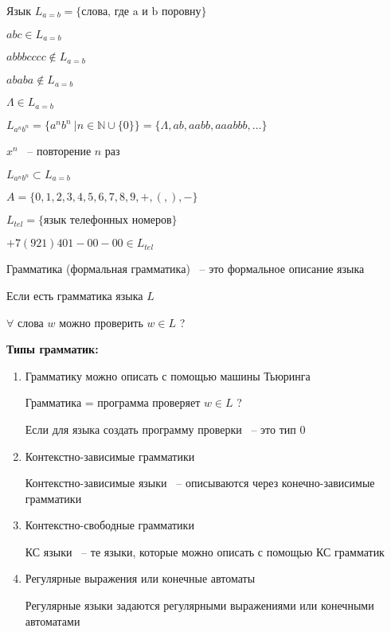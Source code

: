 \documentclass[russian]{lecture-notes}
\begin{document}
    \begin{example}
        Язык $L_{a = b} = \{ \textrm{слова, где a и b поровну}\}$

        $abc \in L_{a = b}$

        $abbbcccc \notin L_{a = b}$

        $ababa \notin L_{a = b}$

        $\Lambda \in L_{a = b}$
    \end{example}

    \begin{example}

        $L_{a^n b^n} = \{ a^n b^n \: | n \in \mathbb{N} \cup \{0 \} \} = \{ \Lambda, ab, aabb, aaabbb, \dots \}$

        $x^n$ ~-- повторение $n$ раз

        $L_{a^n b^n} \subset L_{a = b}$
    \end{example}

    \begin{example}
        $A = \{ 0, 1, 2, 3, 4, 5, 6, 7, 8, 9, +, (, ), - \}$

        $L_{tel} = \{ \textrm{язык телефонных номеров} \}$

        $+7 (921) 401-00-00 \in L_{tel}$
    \end{example}

    \begin{definition}
        Грамматика (формальная грамматика) ~-- это формальное описание языка

        Если есть грамматика языка $L$

        $\forall$ слова $w$ можно проверить $w \in L$ ?
    \end{definition}

    \textbf{Типы грамматик:}

    \begin{enumerate}
        \addtocounter{enumi}{-1}
        \item{
            Грамматику можно описать с помощью машины Тьюринга

            Грамматика = программа проверяет $w \in L$ ?

            Если для языка создать программу проверки ~-- это тип 0
        }
        \item{
            Контекстно-зависимые грамматики

            Контекстно-зависимые языки ~-- описываются через конечно-зависимые грамматики
        }
        \item{
            Контекстно-свободные грамматики

            КС языки ~-- те языки, которые можно описать с помощью КС грамматик
        }
        \item{
            Регулярные выражения или конечные автоматы

            Регулярные языки задаются регулярными выражениями или конечными автоматами
        }
    \end{enumerate}
\end{document}
